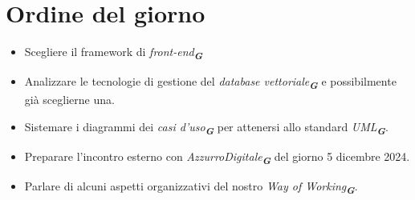 

\section{Ordine del giorno}

\begin{itemize}
    \item Scegliere il framework di \emph{front-end}\textsubscript{\textit{\textbf{G}}}
    \item Analizzare le tecnologie di gestione del \emph{database vettoriale}\textsubscript{\textit{\textbf{G}}} e possibilmente già sceglierne una.
    \item Sistemare i diagrammi dei \emph{casi d'uso}\textsubscript{\textit{\textbf{G}}} per attenersi allo standard \emph{UML}\textsubscript{\textit{\textbf{G}}}.
    \item Preparare l'incontro esterno con \emph{AzzurroDigitale}\textsubscript{\textit{\textbf{G}}} del giorno 5 dicembre 2024.
    \item Parlare di alcuni aspetti organizzativi del nostro \emph{Way of Working}\textsubscript{\textit{\textbf{G}}}.
\end{itemize}